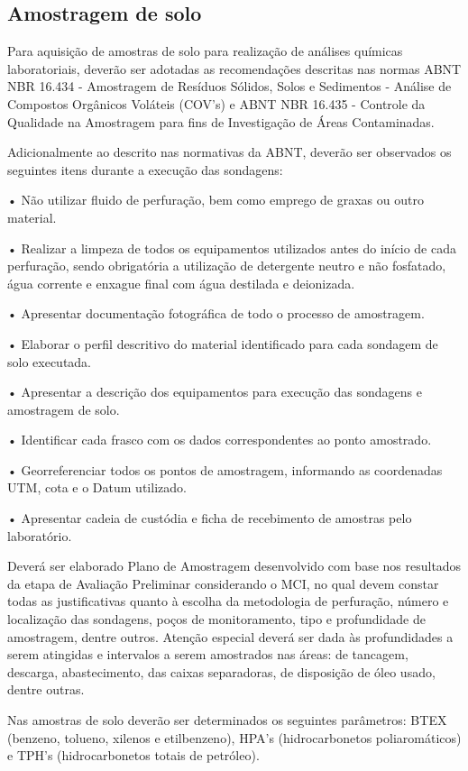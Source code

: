 \subsection{Amostragem de solo}

Para aquisição de amostras de solo para realização de 
análises químicas laboratoriais, deverão ser adotadas as 
recomendações descritas nas normas ABNT NBR 16.434 - 
Amostragem de Resíduos Sólidos, Solos e Sedimentos - 
Análise de Compostos Orgânicos Voláteis (COV’s) e ABNT NBR 
16.435 - Controle da Qualidade na Amostragem para fins de 
Investigação de Áreas Contaminadas.

Adicionalmente ao descrito nas normativas da ABNT, deverão 
ser observados os seguintes itens durante a execução das 
sondagens:

• Não utilizar fluido de perfuração, bem como emprego de 
graxas ou outro material.

• Realizar a limpeza de todos os equipamentos utilizados 
antes do início de cada perfuração, sendo obrigatória a 
utilização de detergente neutro e não fosfatado, água 
corrente e enxague final com água destilada e deionizada.

• Apresentar documentação fotográfica de todo o processo de 
amostragem.

• Elaborar o perfil descritivo do material identificado 
para cada sondagem de solo executada.

• Apresentar a descrição dos equipamentos para execução das 
sondagens e amostragem de solo.

• Identificar cada frasco com os dados correspondentes ao 
ponto amostrado.

• Georreferenciar todos os pontos de amostragem, informando 
as coordenadas UTM, cota e o Datum utilizado.

• Apresentar cadeia de custódia e ficha de recebimento de 
amostras pelo laboratório.

Deverá ser elaborado Plano de Amostragem desenvolvido com 
base nos resultados da etapa de Avaliação Preliminar 
considerando o MCI, no qual devem constar todas as 
justificativas quanto à escolha da metodologia de 
perfuração, número e localização das sondagens, poços de 
monitoramento, tipo e profundidade de amostragem, dentre 
outros. Atenção especial deverá ser dada às profundidades a 
serem atingidas e intervalos a serem amostrados nas áreas: 
de tancagem, descarga, abastecimento, das caixas 
separadoras, de disposição de óleo usado, dentre outras.

Nas amostras de solo deverão ser determinados os seguintes 
parâmetros: BTEX (benzeno, tolueno, xilenos e etilbenzeno), 
HPA’s (hidrocarbonetos poliaromáticos) e TPH’s 
(hidrocarbonetos totais de petróleo).

